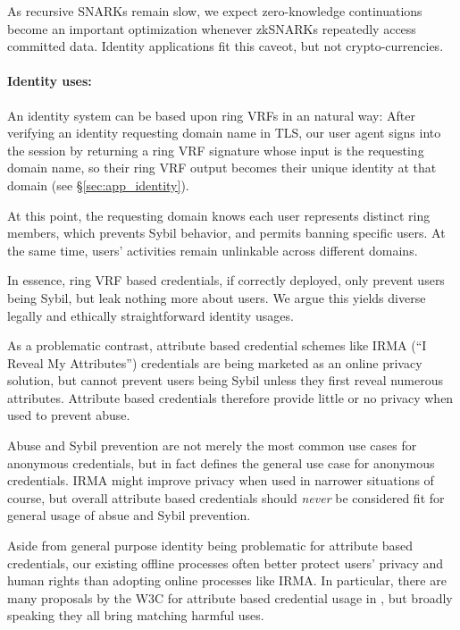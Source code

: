 As recursive SNARKs remain slow,
we expect zero-knowledge continuations become an important optimization 
whenever zkSNARKs repeatedly access committed data.
Identity applications fit this caveot, but not crypto-currencies.

\paragraph{Identity uses:}

An identity system can be based upon ring VRFs in an natural way:
After verifying an identity requesting domain name in TLS,
our user agent signs into the session by returning a ring VRF
signature whose input is the requesting domain name, so their
ring VRF output becomes their unique identity at that domain
(see \S\ref{sec:app_identity}).

At this point, the requesting domain knows each user represents
distinct ring members, which prevents Sybil behavior, and permits
banning specific users.
At the same time, users' activities remain unlinkable across different
domains.

In essence, ring VRF based credentials, if correctly deployed, only
prevent users being Sybil, but leak nothing more about users.  We argue
this yields diverse legally and ethically straightforward identity usages.

As a problematic contrast, attribute based credential schemes like
IRMA (``I Reveal My Attributes'') credentials \cite{IRMAcredentials}
are being marketed as an online privacy solution, but cannot prevent
users being Sybil unless they first reveal numerous attributes.
Attribute based credentials therefore provide little or no privacy
when used to prevent abuse.

Abuse and Sybil prevention are not merely the most common use cases for
anonymous credentials, but in fact defines the general use case for
anonymous credentials.
IRMA might improve privacy when used in narrower situations of course,
but overall attribute based credentials should {\it never} be considered
fit for general usage of absue and Sybil prevention.

Aside from general purpose identity being problematic for attribute based
credentials, our existing offline processes often better protect users'
privacy and human rights than adopting online processes like IRMA.
%
In particular, there are many proposals by the W3C for attribute based
credential usage in \cite{w3c_vc_use_cases}, but broadly speaking they
all bring matching harmful uses.  %

